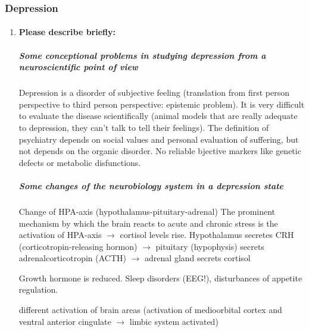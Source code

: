 \documentclass[12pt,article,oneside,a4paper]{memoir}
\begin{document}
\subsubsection{Depression}
\begin{enumerate}
\item \paragraph{Please describe briefly:}
\subparagraph{Some conceptional problems in studying depression from a neuroscientific point of view} 

Depression is a disorder of subjective feeling (translation from first person perspective to third person perspective: epistemic problem). It is very difficult to evaluate the disease scientifically (animal models that are really adequate to depression, they can’t talk to tell their feelings). The definition of psychiatry depends on social values and personal evaluation of suffering, but not depends on the organic disorder. No reliable bjective markers like genetic defects or metabolic disfunctions.

\subparagraph{Some changes of the neurobiology system in a depression state}
Change of HPA-axis (hypothalamus-pituitary-adrenal)
	The prominent mechanism by which the brain reacts to acute and chronic stress is the activation of HPA-axis $\rightarrow$ cortisol levels rise.
		Hypothalamus secretes CRH (corticotropin-releasing hormon) $\rightarrow$ pituitary (hypophysis) secrets adrenalcorticotropin (ACTH) $\rightarrow$ adrenal gland secrets cortisol

Growth hormone is reduced.
	Sleep disorders (EEG!), disturbances of appetite regulation.

different activation of brain areas (activation of medioorbital cortex and ventral anterior cingulate $\rightarrow$ limbic system activated)

\end{enumerate}
\end{document}

